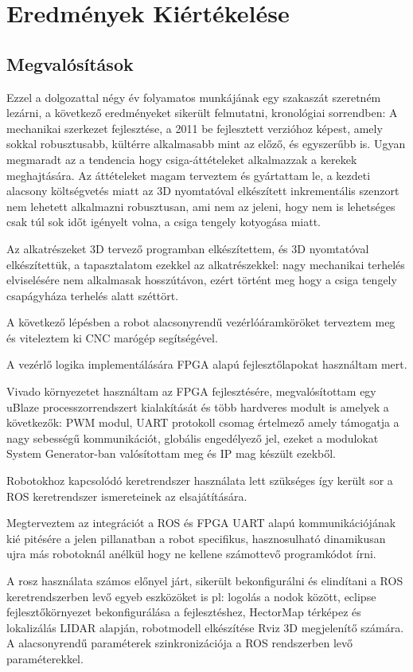 \chapter{Eredmények Kiértékelése}
\section{Megvalósítások}
Ezzel a dolgozattal négy év folyamatos munkájának egy szakaszát szeretném lezárni, a következő eredményeket sikerült felmutatni, kronológiai sorrendben: 
A mechanikai szerkezet fejlesztése, a 2011 be fejlesztett verzióhoz képest, amely sokkal robusztusabb, kültérre alkalmasabb mint az előző, és egyszerűbb is. Ugyan megmaradt az a tendencia hogy csiga-áttételeket alkalmazzak a kerekek meghajtására. Az áttételeket magam terveztem és gyártattam le, a kezdeti alacsony költségvetés miatt az 3D nyomtatóval elkészített inkrementális szenzort nem lehetett alkalmazni robusztusan, ami nem az jeleni, hogy nem is lehetséges csak túl sok időt igényelt volna, a csiga tengely kotyogása miatt.

Az alkatrészeket 3D tervező programban elkészítettem, és 3D nyomtatóval elkészítettük, a tapasztalatom ezekkel az alkatrészekkel: nagy mechanikai terhelés elviselésére nem alkalmasak hosszútávon, ezért történt meg hogy a csiga tengely csapágyháza terhelés alatt széttört.

A következő lépésben a robot alacsonyrendű vezérlóáramköröket terveztem meg és viteleztem ki CNC marógép segítségével.

A vezérlő logika implementálására FPGA alapú fejlesztőlapokat használtam mert.

Vivado környezetet használtam az FPGA fejlesztésére, megvalósítottam egy uBlaze processzorrendszert kialakítását és több hardveres modult is amelyek a következők: PWM modul, UART protokoll csomag értelmező amely támogatja a nagy sebességű kommunikációt, globális engedélyező jel, ezeket a modulokat System Generator-ban valósítottam meg és IP mag készült ezekből.

Robotokhoz kapcsolódó keretrendszer használata lett szükséges így került sor a ROS keretrendszer ismereteinek az elsajátítására.

Megterveztem az integrációt a ROS és FPGA UART alapú kommunikációjának kié pitésére a jelen pillanatban a robot specifikus, hasznosulható dinamikusan ujra más robotoknál anélkül hogy ne kellene számottevő programkódot írni.

A rosz használata számos előnyel járt, sikerült bekonfigurálni és elindítani a ROS keretrendszerben levő egyeb eszközöket is pl: logolás a nodok között, eclipse fejlesztőkörnyezet bekonfigurálása a fejlesztéshez, HectorMap térképez és lokalizálás LIDAR alapján, robotmodell elkészítése Rviz 3D megjelenítő számára. A alacsonyrendű paraméterek szinkronizációja a ROS rendszerben levő paraméterekkel.

